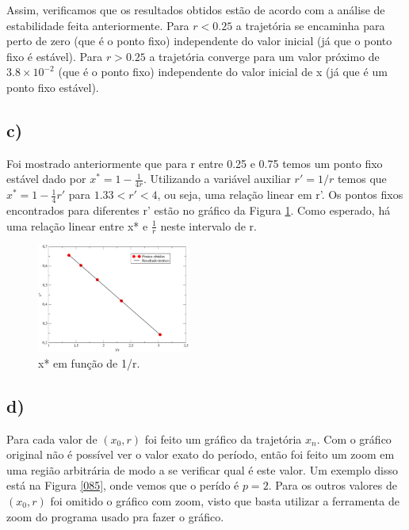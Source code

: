 \documentclass[a4wide]{report}
\begin{document}
Assim, verificamos que os resultados obtidos estão de acordo com a análise de estabilidade feita anteriormente. Para $r < 0.25$ a trajetória se encaminha para perto de zero (que é o ponto fixo) independente do valor inicial (já que o ponto fixo é estável). Para $r > 0.25$ a trajetória converge para um valor próximo de $3.8\times10^{-2}$ (que é o ponto fixo) independente do valor inicial de x (já que é um ponto fixo estável).




\subsection*{ c) }

Foi mostrado anteriormente que para r entre 0.25 e 0.75 temos um ponto fixo estável dado por $x^* = 1 - \frac{1}{4r}$. Utilizando a variável auxiliar $r' = 1/r$ temos que $x^* = 1 - \frac{1}{4}r'$ para $1.33 < r' < 4$, ou seja, uma relação linear em r'. Os pontos fixos encontrados para diferentes r' estão no gráfico da Figura \ref{c)}. Como esperado, há uma relação linear entre x* e $\frac{1}{r}$ neste intervalo de r.

\begin{figure}[!htb]
\centering
\includegraphics[width=0.447\textwidth]{1r.pdf}
\caption{x* em função de 1/r.}
\label{c)}
\end{figure}



\subsection*{ d) }

Para cada valor de $(x_0,r)$ foi feito um gráfico da trajetória $x_n$. Com o gráfico original não é possível ver o valor exato do período, então foi feito um zoom em uma região arbitrária de modo a se verificar qual é este valor. Um exemplo disso está na Figura \ref{085}, onde vemos que o perído é $p = 2$. Para os outros valores de $(x_0,r)$ foi omitido o gráfico com zoom, visto que basta utilizar a ferramenta de zoom do programa usado pra fazer o gráfico.
\end{document}

